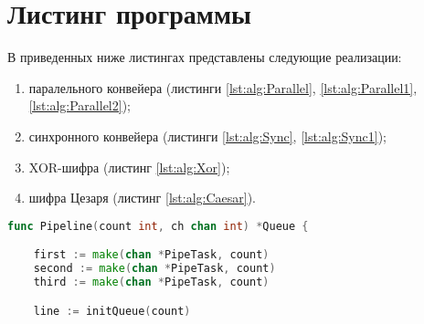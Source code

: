     \section{Листинг программы}
        В приведенных ниже листингах представлены следующие реализации: 
        \begin{enumerate}
            \item паралельного конвейера (листинги \ref{lst:alg:Parallel}, \ref{lst:alg:Parallel1}, \ref{lst:alg:Parallel2});
            \item синхронного конвейера (листинги \ref{lst:alg:Sync}, \ref{lst:alg:Sync1});
            \item XOR-шифра (листинг \ref{lst:alg:Xor});
            \item шифра Цезаря (листинг \ref{lst:alg:Caesar}).
        \end{enumerate}
        \par \text{           }
        \begin{lstlisting}[language=Go, label=lst:alg:Parallel, caption=Реализация параллельного конвейера]
func Pipeline(count int, ch chan int) *Queue {

    first := make(chan *PipeTask, count)
    second := make(chan *PipeTask, count)
    third := make(chan *PipeTask, count)

    line := initQueue(count)
\end{lstlisting}
\par \text{           }
\par \text{           }
\par \text{           }
\par \text{           }
